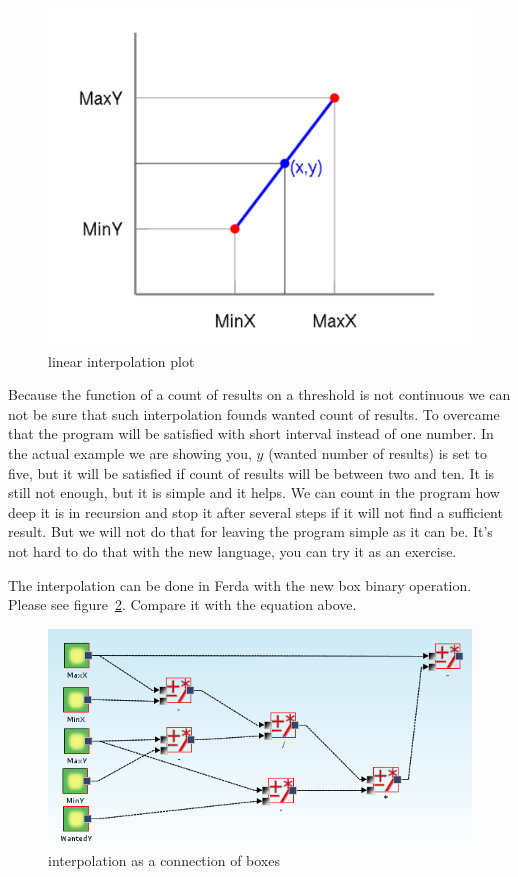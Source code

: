 \documentclass[a4paper,12pt]{book}
\begin{document}
\begin{figure}
	\includegraphics[width=1\textwidth]{linearInterpolationPlot}
	\caption{linear interpolation plot}
	\label{fig:linearInterpolationPlot}
\end{figure}

Because the function of a count of results on a threshold is not continuous we can not be sure that such interpolation founds wanted count of results. To overcame that the program will be satisfied with short interval instead of one number. In the actual example we are showing you, $y$ (wanted number of results) is set to five, but it will be satisfied if count of results will be between two and ten. It is still not enough, but it is simple and it helps. We can count in the program how deep it is in recursion and stop it after several steps if it will not find a sufficient result. But we will not do that for leaving the program simple as it can be. It's not hard to do that with the new language, you can try it as an exercise. 

The interpolation can be done in Ferda with the new box binary operation. Please see figure~\ref{fig:linearInterpolationBoxes}. Compare it with the equation above.

\begin{figure}
	\includegraphics[width=1\textwidth]{linearInterpolation}
	\caption{interpolation as a connection of boxes}
	\label{fig:linearInterpolationBoxes}
\end{figure}
\end{document}
